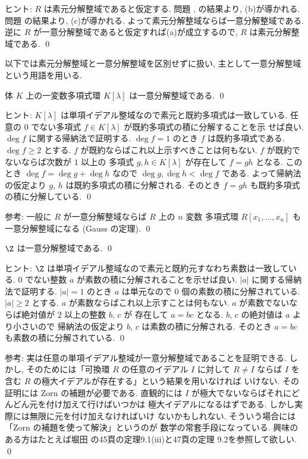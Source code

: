 \documentclass[12pt,twoside]{jarticle}
\begin{document}
\noindent
ヒント: $R$ は素元分解整域であると仮定する.
問題 ,  の結果より, 
(b)が導かれる.  問題  の結果より,
(c)が導かれる. よって素元分解整域ならば一意分解整域である.
逆に $R$ が一意分解整域であると仮定すれば(a)が成立するので, 
$R$ は素元分解整域である. 
\qed

\medskip

以下では素元分解整域と一意分解整域を区別せずに扱い, 
主として一意分解整域という用語を用いる.


\begin{question}
  体 $K$ 上の一変数多項式環 $K[\lambda]$ は一意分解整域である.
  \qed
\end{question}

\noindent
ヒント: $K[\lambda]$ は単項イデアル整域なので素元と既約多項式は一致している.
任意の $0$ でない多項式 $f\in K[\lambda]$ が既約多項式の積に分解することを示
せば良い. $\deg f$ に関する帰納法で証明する.
$\deg f=1$ のとき $f$ は既約多項式である.
$\deg f\ge 2$ とする. $f$ が既約ならばこれ以上示すべきことは何もない.
$f$ が既約でないならば次数が $1$ 以上の
多項式 $g,h\in K[\lambda]$ が存在して $f=gh$ となる.
このとき $\deg f = \deg g + \deg h$ なので $\deg g,\deg h< \deg f$ である.
よって帰納法の仮定より $g$, $h$ は既約多項式の積に分解される.
そのとき $f=gh$ も既約多項式の積に分解している.
\qed

\medskip
\noindent
参考: 一般に $R$ が一意分解整域ならば $R$ 上の $n$ 変数
多項式環 $R[x_1,\dots,x_n]$ も一意分解整域になる (Gauss の定理).
\qed


\begin{question}
  $\Z$ は一意分解整域である.
  \qed
\end{question}

\noindent
ヒント: $\Z$ は単項イデアル整域なので素元と既約元すなわち素数は一致している.
$0$ でない整数 $a$ が素数の積に分解されることを示せば良い.
$|a|$ に関する帰納法で証明する.
$|a|=1$ のとき $a$ は単元なので $0$ 個の素数の積に分解されている.
$|a|\ge 2$ とする. $a$ が素数ならばこれ以上示すことは何もない.
$a$ が素数でないならば絶対値が $2$ 以上の整数 $b$, $c$ が
存在して $a=bc$ となる. $b$, $c$ の絶対値は $a$ より小さいので
帰納法の仮定より $b$, $c$ は素数の積に分解される.
そのとき $a=bc$ も素数の積に分解されている.
\qed

\medskip
\noindent
参考: 実は任意の単項イデアル整域が一意分解整域であることを証明できる.
しかし, そのためには「可換環 $R$ の任意のイデアル $I$ に対して $R\ne I$ 
ならば $I$ を含む $R$ の極大イデアルが存在する」という結果を用いなければ
いけない. その証明には Zorn の補題が必要である.  
直観的には $I$ が極大でないならばそれにどんどん元を付け加えて行けばいつかは
極大イデアルになるはずである.  しかし実際には無限に元を付け加えなければいけ
ないかもしれない.  そういう場合には「Zorn の補題を使って解決」というのが
数学の常套手段になっている. 
興味のある方はたとえば堀田 \cite{gun-kagun} の45頁の定理9.1(iii)と47頁の定理 
9.2を参照して欲しい.
\qed
\end{document}
